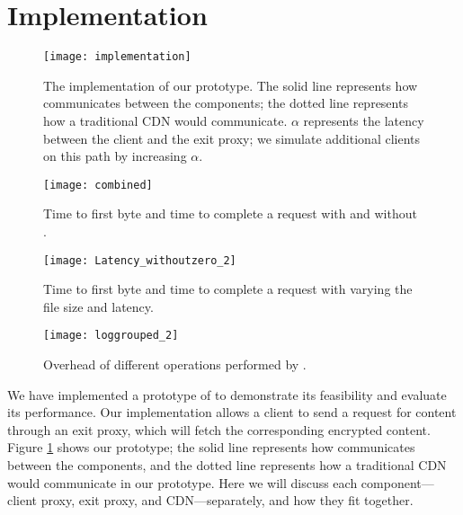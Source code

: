 \section{Implementation}
\label{sec:implementation}
\begin{figure}[t]
\centering
\texttt{[image: implementation]}
\caption{The implementation of our \system{} prototype.  The solid line represents
how \system{} communicates between the components; the dotted line represents how 
a traditional CDN would communicate. $\alpha$ represents the latency between the client 
and the exit proxy; we simulate additional clients on this path by increasing $\alpha$.}
\label{fig:impl}
\end{figure}


\begin{figure*}[t!]
\vspace{-2mm}
  \begin{minipage}[t]{.31\linewidth}
    \centering
     \texttt{[image: combined]}
    \caption{Time to first byte and time to complete a request with and without \system{}.}
    \label{fig:completion}
  \end{minipage}
  \hfill
  \begin{minipage}[t]{.29\linewidth}
    \centering
    \texttt{[image: Latency\_withoutzero\_2]}
    \caption{Time to first byte and time to complete a request with varying the file size and latency.}%
    \label{fig:latency}
  \end{minipage}
  \hfill
  \begin{minipage}[t]{.35\linewidth}
    \centering
    \texttt{[image: loggrouped\_2]}
\caption{Overhead of different operations performed by \system{}.}
\label{fig:overhead2}
  \end{minipage}
\end{figure*}


We have implemented a prototype of \system{} to demonstrate its feasibility and 
evaluate its performance.  Our implementation allows a client to send a request 
for content through an exit proxy, which will fetch the corresponding 
encrypted content.  Figure \ref{fig:impl} shows our prototype; the solid line represents
how \system{} communicates between the components, and the dotted line represents how 
a traditional CDN would communicate in our prototype.  Here we will discuss each component---client proxy, exit proxy, 
and CDN---separately, and how they fit together.




